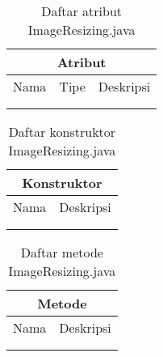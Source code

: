 \begin{table}[H]
    \centering
    \begin{tabular}{c|c|c}
        \hline
        \hline
        \multicolumn{3}{c}{\textbf{Atribut}}\\
        \hline
        \hline
         Nama & Tipe & Deskripsi \\
         \hline 
         \hline 
         &  & \\
         &  & \\
    \end{tabular}
    \caption{Daftar atribut ImageResizing.java}
\end{table}

\begin{table}[H]
    \centering
    \begin{tabular}{c|c}
        \hline
        \hline
        \multicolumn{2}{c}{\textbf{Konstruktor}}\\
        \hline
        \hline
         Nama  & Deskripsi \\
         \hline 
         \hline 
         &  \\
         &  \\
    \end{tabular}
    \caption{Daftar konstruktor ImageResizing.java}
\end{table}

\begin{table}[H]
    \centering
    \begin{tabular}{c|c}
        \hline
        \hline
        \multicolumn{2}{c}{\textbf{Metode}}\\
        \hline
        \hline
         Nama  & Deskripsi \\
         \hline 
         \hline 
         &  \\
         &  \\
    \end{tabular}
    \caption{Daftar metode ImageResizing.java}
\end{table}

\pagebreak